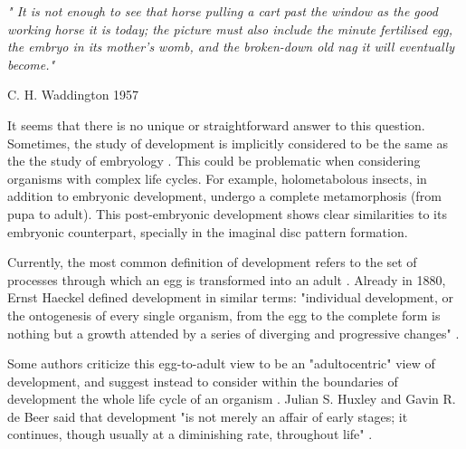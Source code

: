 \setlength{\epigraphrule}{0\p@}
\setlength{\epigraphwidth}{.7\textwidth}
\epigraph{\textit{" It is not enough to see that horse pulling a cart past
the window as the good working horse it is today; the picture
must also include the minute fertilised egg, the embryo in its
mother's womb, and the broken-down old nag it will eventually
become."}}{C. H. Waddington 1957}

It seems that there is no unique or straightforward answer to this question.
Sometimes, the study of development is implicitly considered to be the same as the the study of embryology \citep{Horder2010}.
This could be problematic when considering organisms with complex life cycles. For example, holometabolous insects, in addition to embryonic development, undergo a complete metamorphosis (from pupa to adult). This post-embryonic development shows clear similarities to its embryonic counterpart, specially in the imaginal disc pattern formation.%

Currently, the most common definition of development refers to the set of processes through which an egg is transformed into an adult \citep{Horder2010,Minelli2011}.
Already in 1880, Ernst Haeckel defined development in similar terms: "individual development, or the ontogenesis of every single organism, from the egg to the complete form is nothing but a growth attended by a series of diverging and progressive changes" \citep{haeckel_historycreation1880}.

Some authors criticize this egg-to-adult view to be an "adultocentric" view of development, and suggest instead to consider within the boundaries of development the whole life cycle of an organism \citep{Gilbert2011,Minelli2011}.
Julian S. Huxley and Gavin R. de Beer said that development "is not merely an affair of early stages; it continues, though usually at a diminishing rate, throughout life" \citep{huxley1963elements}.


